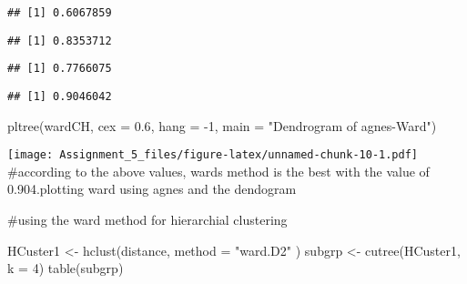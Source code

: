 \documentclass[
]{article}
\newenvironment{Shaded}{\begin{snugshade}}{\end{snugshade}}
\newcommand{\AttributeTok}[1]{\textcolor[rgb]{0.77,0.63,0.00}{#1}}
\newcommand{\DecValTok}[1]{\textcolor[rgb]{0.00,0.00,0.81}{#1}}
\newcommand{\FloatTok}[1]{\textcolor[rgb]{0.00,0.00,0.81}{#1}}
\newcommand{\FunctionTok}[1]{\textcolor[rgb]{0.00,0.00,0.00}{#1}}
\newcommand{\NormalTok}[1]{#1}
\newcommand{\OtherTok}[1]{\textcolor[rgb]{0.56,0.35,0.01}{#1}}
\newcommand{\SpecialCharTok}[1]{\textcolor[rgb]{0.00,0.00,0.00}{#1}}
\newcommand{\StringTok}[1]{\textcolor[rgb]{0.31,0.60,0.02}{#1}}
\begin{document}
\begin{verbatim}
## [1] 0.6067859
\end{verbatim}

\begin{Shaded}
\end{Shaded}

\begin{verbatim}
## [1] 0.8353712
\end{verbatim}

\begin{Shaded}
\end{Shaded}

\begin{verbatim}
## [1] 0.7766075
\end{verbatim}

\begin{Shaded}
\end{Shaded}

\begin{verbatim}
## [1] 0.9046042
\end{verbatim}

\begin{Shaded}
\begin{Highlighting}[]
\FunctionTok{pltree}\NormalTok{(wardCH, }\AttributeTok{cex =} \FloatTok{0.6}\NormalTok{, }\AttributeTok{hang =} \SpecialCharTok{{-}}\DecValTok{1}\NormalTok{, }\AttributeTok{main =} \StringTok{"Dendrogram of agnes{-}Ward"}\NormalTok{)}
\end{Highlighting}
\end{Shaded}

\texttt{[image: Assignment\_5\_files/figure-latex/unnamed-chunk-10-1.pdf]}
\#according to the above values, wards method is the best with the value
of 0.904.plotting ward using agnes and the dendogram

\#using the ward method for hierarchial clustering

\begin{Shaded}
\begin{Highlighting}[]
\NormalTok{HCuster1 }\OtherTok{\textless{}{-}} \FunctionTok{hclust}\NormalTok{(distance, }\AttributeTok{method =} \StringTok{"ward.D2"}\NormalTok{ )}
\NormalTok{subgrp }\OtherTok{\textless{}{-}} \FunctionTok{cutree}\NormalTok{(HCuster1, }\AttributeTok{k =} \DecValTok{4}\NormalTok{)}
\FunctionTok{table}\NormalTok{(subgrp)}
\end{Highlighting}
\end{Shaded}
\end{document}
